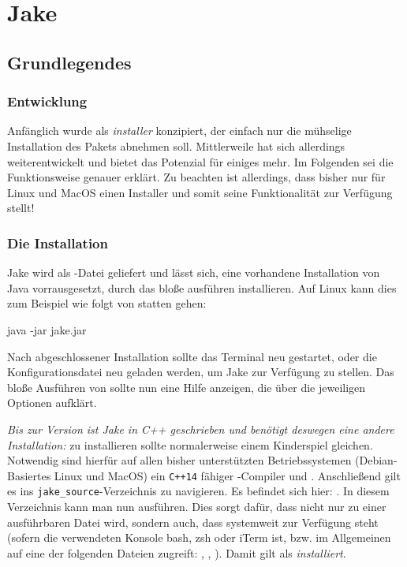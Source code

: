 \renewcommand\arraystretch{1.5}
\chapter[Jake \LILLYxBOXxVersion{\small 1.0.8}]{Jake}
\section{Grundlegendes}
\subsection{Entwicklung}
Anfänglich wurde \Jake als \emph{installer} konzipiert, der einfach nur die mühselige Installation
des Pakets abnehmen soll. Mittlerweile hat sich \Jake allerdings weiterentwickelt und
bietet das Potenzial für einiges mehr. Im Folgenden sei die Funktionsweise genauer erklärt.
Zu beachten ist allerdings, dass \Jake bisher nur für Linux und MacOS einen Installer und somit
seine Funktionalität zur Verfügung stellt!

\subsection{Die Installation}
Jake wird als -Datei geliefert und lässt sich, eine vorhandene Installation von Java vorrausgesetzt, durch das bloße ausführen installieren. Auf Linux kann dies zum Beispiel wie folgt von statten gehen:
\begin{bash*}
java -jar jake.jar
\end{bash*}
Nach abgeschlossener Installation sollte das Terminal neu gestartet, oder die Konfigurationsdatei neu geladen werden, um Jake zur Verfügung zu stellen. Das bloße Ausführen von  sollte nun eine Hilfe anzeigen, die über die jeweiligen Optionen aufklärt.

\begin{bemerkung}[C++ Jake]
\textit{Bis zur Version  ist Jake in C++ geschrieben und benötigt deswegen eine andere Installation:}\newline
\Jake zu installieren sollte normalerweise einem Kinderspiel gleichen. Notwendig sind hierfür
auf allen bisher unterstützten Betriebssystemen (Debian-Basiertes Linux und MacOS) ein
\verb|C++14| fähiger -Compiler und .
Anschließend gilt es ins \verb|jake_source|-Verzeichnis zu navigieren.
Es befindet sich hier: .
In diesem Verzeichnis kann man nun  ausführen. Dies sorgt dafür,
dass nicht nur  zu einer ausführbaren Datei wird, sondern auch,
dass \LJake systemweit zur Verfügung steht (sofern die verwendeten Konsole
bash, zsh oder iTerm ist, bzw. im Allgemeinen auf eine der folgenden Dateien
zugreift: , , ).\newline
Damit gilt \Jake als \emph{installiert}.
\end{bemerkung}


